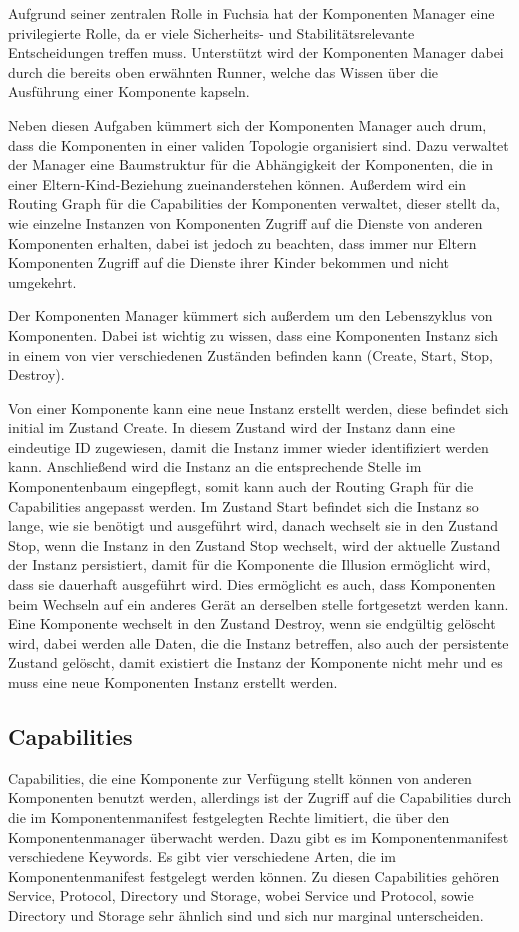 \documentclass[a4paper]{scrartcl}
\begin{document}
Aufgrund seiner zentralen Rolle in Fuchsia hat der Komponenten Manager eine privilegierte Rolle, da er viele Sicherheits- und Stabilitätsrelevante Entscheidungen treffen muss. Unterstützt wird der Komponenten Manager dabei durch die bereits oben erwähnten Runner, welche das Wissen über die Ausführung einer Komponente kapseln.

Neben diesen Aufgaben kümmert sich der Komponenten Manager auch drum, dass die Komponenten in einer validen Topologie organisiert sind. Dazu verwaltet der Manager eine Baumstruktur für die Abhängigkeit der Komponenten, die in einer Eltern-Kind-Beziehung zueinanderstehen können. Außerdem wird ein Routing Graph für die Capabilities der Komponenten verwaltet, dieser stellt da, wie einzelne Instanzen von Komponenten Zugriff auf die Dienste von anderen Komponenten erhalten, dabei ist jedoch zu beachten, dass immer nur Eltern Komponenten Zugriff auf die Dienste ihrer Kinder bekommen und nicht umgekehrt.

Der Komponenten Manager kümmert sich außerdem um den Lebenszyklus von Komponenten. Dabei ist wichtig zu wissen, dass eine Komponenten Instanz sich in einem von vier verschiedenen Zuständen befinden kann (Create, Start, Stop, Destroy).

Von einer Komponente kann eine neue Instanz erstellt werden, diese befindet sich initial im Zustand Create. In diesem Zustand wird der Instanz dann eine eindeutige ID zugewiesen, damit die Instanz immer wieder identifiziert werden kann. Anschließend wird die Instanz an die entsprechende Stelle im Komponentenbaum eingepflegt, somit kann auch der Routing Graph für die Capabilities angepasst werden. Im Zustand Start befindet sich die Instanz so lange, wie sie benötigt und ausgeführt wird, danach wechselt sie in den Zustand Stop, wenn die Instanz in den Zustand Stop wechselt, wird der aktuelle Zustand der Instanz persistiert, damit für die Komponente die Illusion ermöglicht wird, dass sie dauerhaft ausgeführt wird. Dies ermöglicht es auch, dass Komponenten beim Wechseln auf ein anderes Gerät an derselben stelle fortgesetzt werden kann. Eine Komponente wechselt in den Zustand Destroy, wenn sie endgültig gelöscht wird, dabei werden alle Daten, die die Instanz betreffen, also auch der persistente Zustand gelöscht, damit existiert die Instanz der Komponente nicht mehr und es muss eine neue Komponenten Instanz erstellt werden.

\subsection{Capabilities}
\label{sec:Capabilities}
Capabilities, die eine Komponente zur Verfügung stellt können von anderen Komponenten benutzt werden, allerdings ist der Zugriff auf die Capabilities durch die im Komponentenmanifest festgelegten Rechte limitiert, die über den Komponentenmanager überwacht werden. Dazu gibt es im Komponentenmanifest verschiedene Keywords. Es gibt vier verschiedene Arten, die im Komponentenmanifest festgelegt werden können. Zu diesen Capabilities gehören Service, Protocol, Directory und Storage, wobei Service und Protocol, sowie Directory und Storage sehr ähnlich sind und sich nur marginal unterscheiden.
\end{document}
